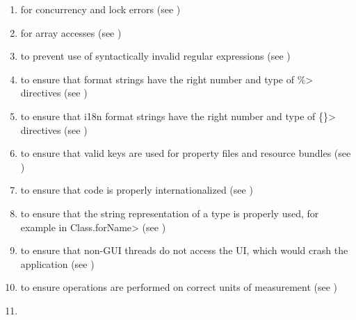 \begin{enumerate}
\item
   for concurrency and lock errors
  (see )
\item
   for array accesses
  (see )
\item
   to prevent use of syntactically
  invalid regular expressions (see )
\item
   to ensure that format
  strings have the right number and type of \<\%> directives (see
  )
\item
  to ensure that i18n format strings have the right number and type of
  \<\{\}> directives (see )
\item
   to ensure that valid
  keys are used for property files and resource bundles (see
  )
\item
   to
  ensure that code is properly internationalized (see
  )
\item
   to ensure that the
  string representation of a type is properly used, for example in
  \<Class.forName> (see )
\item
   to ensure that non-GUI
  threads do not access the UI, which would crash the application
  (see )
\item
   to ensure operations are
  performed on correct units of measurement
  (see )
\item

\end{enumerate}
